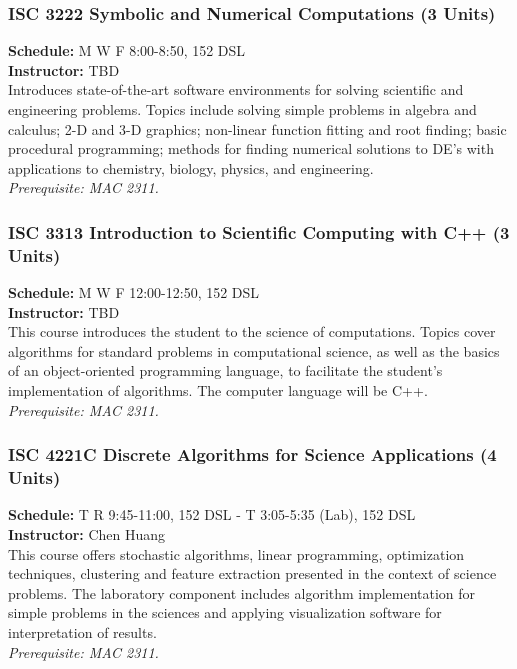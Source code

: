 \documentclass[12pt,a4paper]{article}
\begin{document}
\subsubsection*{ISC 3222 Symbolic and Numerical Computations (3 Units)}
\textbf{Schedule:} M W F 8:00-8:50, 152 DSL \\
\textbf{Instructor:} TBD \\
Introduces state-of-the-art software environments for solving scientific and engineering problems. Topics include solving simple problems in algebra and calculus; 2-D and 3-D graphics; non-linear function fitting and root finding; basic procedural programming; methods for finding numerical solutions to DE's with applications to chemistry, biology, physics, and engineering. \\
\textit{Prerequisite: MAC 2311.}

\subsubsection*{ISC 3313 Introduction to Scientific Computing with C++ (3 Units)}
\textbf{Schedule:} M W F 12:00-12:50, 152 DSL \\
\textbf{Instructor:} TBD \\
This course introduces the student to the science of computations. Topics cover algorithms for standard problems in computational science, as well as the basics of an object-oriented programming language, to facilitate the student’s implementation of algorithms. The computer language will be C++. \\
\textit{Prerequisite: MAC 2311.}

\subsubsection*{ISC 4221C Discrete Algorithms for Science Applications (4 Units)}
\textbf{Schedule:} T R 9:45-11:00, 152 DSL - T 3:05-5:35 (Lab), 152 DSL \\
\textbf{Instructor:} Chen Huang \\
This course offers stochastic algorithms, linear programming, optimization techniques, clustering and feature extraction presented in the context of science problems. The laboratory component includes algorithm implementation for simple problems in the sciences and applying visualization software for interpretation of results. \\
\textit{Prerequisite: MAC 2311.}
\end{document}
